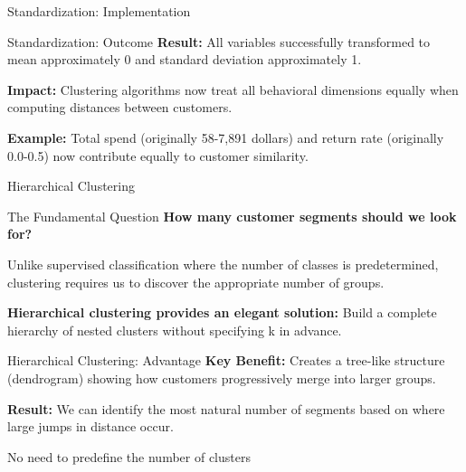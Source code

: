 \documentclass[aspectratio=169,ignorenonframetext]{beamer}
\begin{document}
\begin{frame}[fragile]{Standardization: Implementation}
\begin{Shaded}
\begin{Highlighting}[]

\OperatorTok{=}
\OperatorTok{=}

\OperatorTok{=}
\OperatorTok{=}
\NormalTok{)}

\end{Highlighting}
\end{Shaded}
\end{frame}

\begin{frame}{Standardization: Outcome}
\textbf{Result:} All variables successfully transformed to mean
approximately 0 and standard deviation approximately 1.

\textbf{Impact:} Clustering algorithms now treat all behavioral
dimensions equally when computing distances between customers.

\textbf{Example:} Total spend (originally 58-7,891 dollars) and return
rate (originally 0.0-0.5) now contribute equally to customer similarity.
\end{frame}

\begin{frame}{Hierarchical Clustering}
\begin{block}{The Fundamental Question}
\textbf{How many customer segments should we look for?}

Unlike supervised classification where the number of classes is
predetermined, clustering requires us to discover the appropriate number
of groups.

\textbf{Hierarchical clustering provides an elegant solution:} Build a
complete hierarchy of nested clusters without specifying k in advance.
\end{block}
\end{frame}

\begin{frame}{Hierarchical Clustering: Advantage}
\textbf{Key Benefit:} Creates a tree-like structure (dendrogram) showing
how customers progressively merge into larger groups.

\textbf{Result:} We can identify the most natural number of segments
based on where large jumps in distance occur.

No need to predefine the number of clusters
\end{frame}
\end{document}
